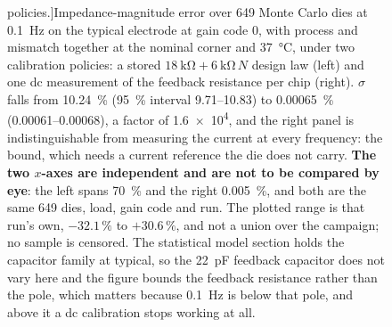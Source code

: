 \begin{figure}[htbp]
{  policies.}]{Impedance-magnitude error over \num{649} Monte Carlo dies at
  \SI{0.1}{\hertz} on the typical electrode at gain code 0, with process and
  mismatch together at the nominal corner and \SI{37}{\celsius}, under two
  calibration policies: a stored \(\SI{18}{\kilo\ohm} + \SI{6}{\kilo\ohm}\,N\)
  design law (left) and one dc measurement of the feedback resistance per chip
  (right). \(\sigma\) falls from \SI{10.24}{\percent}
  (\SI{95}{\percent} interval \numrange{9.71}{10.83}) to
  \SI{0.00065}{\percent} (\numrange{0.00061}{0.00068}), a factor of
  \num{1.6e4}, and the right panel is indistinguishable from measuring the
  current at every frequency: the bound, which needs a current reference the
  die does not carry. \textbf{The two \(x\)-axes are independent and are not to
  be compared by eye}: the left spans \SI{70}{\percent} and the right
  \SI{0.005}{\percent}, and both are the same \num{649} dies, load, gain code
  and run. The plotted range is that run's own, \(-32.1\,\%\) to
  \(+30.6\,\%\), and not a union over the campaign; no sample is censored. The
  statistical model section holds the capacitor family at typical, so the
  \SI{22}{\pico\farad} feedback capacitor does not vary here and the figure
  bounds the feedback resistance rather than the pole, which matters because
  \SI{0.1}{\hertz} is below that pole, and above it a dc calibration stops
  working at all.}
  \label{fig:eis-mccal}
\end{figure}
